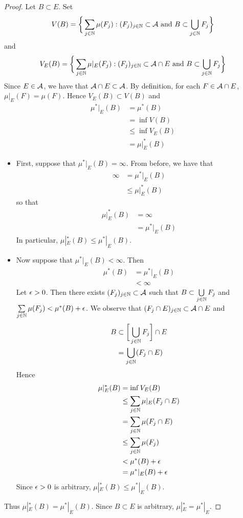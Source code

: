 \documentclass{book}
\begin{document}
	\begin{proof}
		Let $B \subset E$. Set
		$$V(B) = \bigg \{\sum_{j \in \mathbb{N}} \mu(F_j): (F_j)_{j \in \mathbb{N}} \subset \mathcal{A} \text{ and } B \subset \bigcup\limits_{j \in \mathbb{N}} F_j \bigg \}$$ 
		and 
		$$V_E(B) = \bigg \{\sum_{j \in \mathbb{N}} \mu|_E(F_j): (F_j)_{j \in \mathbb{N}} \subset \mathcal{A} \cap E \text{ and } B \subset \bigcup\limits_{j \in \mathbb{N}} F_j \bigg \}$$
		Since $E \in \mathcal{A}$, we have that $\mathcal{A} \cap E \subset \mathcal{A}$. By definition, for each $F \in \mathcal{A} \cap E$, $\mu|_E(F) = \mu(F)$. Hence $V_E(B) \subset V(B)$ and
		\begin{align*}
			\mu^*|_E(B)
			& = \mu^*(B) \\
			& = \inf V(B) \\
			& \leq \inf V_E(B) \\
			& = \mu|_E^*(B)
		\end{align*}
		\begin{itemize}
			\item First, suppose that $\mu^*|_E(B) = \infty$. From before, we have that
			\begin{align*}
				\infty
				& = \mu^*|_E(B) \\
				& \leq \mu|_E^*(B) 
			\end{align*}
			so that 
			\begin{align*}
				\mu|_E^*(B)
				& = \infty \\
				& = \mu^*|_E(B)
			\end{align*}
			In particular, $\mu|_E^*(B) \leq \mu^*|_E(B)$.
			\item Now suppose that $\mu^*|_E(B) < \infty$. Then  
			\begin{align*}
				\mu^*(B) 
				& = \mu^*|_E(B) \\
				& < \infty 
			\end{align*}
			Let $\epsilon >0$. Then there exists $(F_j)_{j \in \mathbb{N}} \subset \mathcal{A}$ such that $B \subset \bigcup\limits_{j \in \mathbb{N}} F_j$ and $\sum\limits_{j \in \mathbb{N}} \mu(F_j) < \mu^*(B) + \epsilon$. We observe that $(F_j \cap E)_{j \in \mathbb{N}} \subset \mathcal{A} \cap E$ and 
			\begin{align*}
				B 
				& \subset \bigg[ \bigcup_{j \in \mathbb{N}} F_j \bigg] \cap E \\
				& = \bigcup_{j \in \mathbb{N}} (F_j \cap E) 
			\end{align*}
			Hence
			\begin{align*}
				\mu|_E^*(B)
				& = \inf V_E(B) \\
				& \leq \sum_{j \in \mathbb{N}} \mu|_E(F_j \cap E) \\
				& = \sum_{j \in \mathbb{N}} \mu(F_j \cap E) \\  
				& \leq \sum_{j \in \mathbb{N}} \mu(F_j) \\
				& < \mu^*(B) + \epsilon \\
				& = \mu^*|_E(B) + \epsilon  
			\end{align*}
			Since $\epsilon >0$ is arbitrary, $\mu|_E^*(B) \leq \mu^*|_E(B)$. \\
		\end{itemize}
		Thus $\mu|_E^*(B) = \mu^*|_E(B)$. Since $B \subset E$ is arbitrary, $\mu|_E^* = \mu^*|_E$.
	\end{proof}
\end{document}
